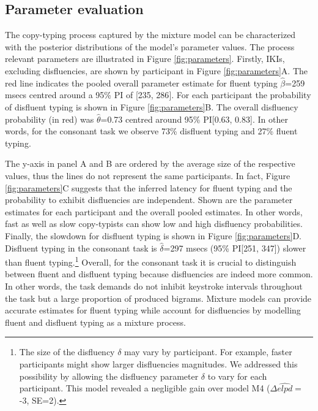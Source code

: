 \documentclass[english,jou,floatsintext]{apa7}
\begin{document}
\hypertarget{parameter-evaluation}{%
\subsection{Parameter evaluation}\label{parameter-evaluation}}

The copy-typing process captured by the mixture model can be characterized with the posterior distributions of the model's parameter values. The process relevant parameters are illustrated in Figure \ref{fig:parameters}. Firstly, IKIs, excluding disfluencies, are shown by participant in Figure \ref{fig:parameters}A. The red line indicates the pooled overall parameter estimate for fluent typing \(\hat{\beta}\)=259 msecs centred around a 95\% PI of {[}235, 286{]}. For each participant the probability of disfluent typing is shown in Figure \ref{fig:parameters}B. The overall disfluency probability (in red) was \(\hat{\theta}\)=0.73 centred around 95\% PI{[}0.63, 0.83{]}. In other words, for the consonant task we observe 73\% disfluent typing and 27\% fluent typing.

The y-axis in panel A and B are ordered by the average size of the respective values, thus the lines do not represent the same participants. In fact, Figure \ref{fig:parameters}C suggests that the inferred latency for fluent typing and the probability to exhibit disfluencies are independent. Shown are the parameter estimates for each participant and the overall pooled estimates. In other words, fast as well as slow copy-typists can show low and high disfluency probabilities. Finally, the slowdown for disfluent typing is shown in Figure \ref{fig:parameters}D. Disfluent typing in the consonant task is \(\hat{\delta}\)=297 msecs (95\% PI{[}251, 347{]}) slower than fluent typing.\footnote{The size of the disfluency \(\delta\) may vary by participant. For example, faster participants might show larger disfluencies magnitudes. We addressed this possibility by allowing the disfluency parameter \(\delta\) to vary for each participant. This model revealed a negligible gain over model M4 (\(\Delta\widehat{elpd}=\)-3, SE=2).} Overall, for the consonant task it is crucial to distinguish between fluent and disfluent typing because disfluencies are indeed more common. In other words, the task demands do not inhibit keystroke intervals throughout the task but a large proportion of produced bigrams. Mixture models can provide accurate estimates for fluent typing while account for disfluencies by modelling fluent and disfluent typing as a mixture process.
\end{document}
